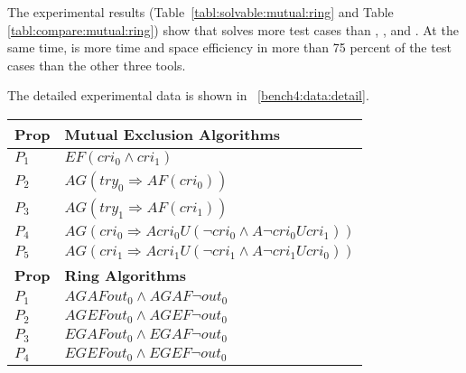
The experimental results (Table~\ref{tabl:solvable:mutual:ring} and Table \ref{tabl:compare:mutual:ring}) show that \sctl{} solves more test cases than \verds, \nusmv{}, and \nuxmv{}. At the same time, \sctl{} is more time and space efficiency in more than 75 percent of the test cases than the other three tools.  

The detailed experimental data is shown in ~\ref{bench4:data:detail}.

\begin{table}
	\begin{center}
		\begin{tabular}{| l | l |}
			\hline
			\textbf{Prop} & \textbf{Mutual Exclusion Algorithms}\\
			\hline
			{$P_1$} & $EF (cri_0 \wedge cri_1)$  \\
			\hline
			{$P_2$} &  $AG (try_0 \Rightarrow AF (cri_0))$\\
			\hline
			{$P_3$} &  $AG (try_1 \Rightarrow AF (cri_1))$\\
			
			\hline
			{$P_4$} &  $AG (cri_0 \Rightarrow A cri_0 U (\neg cri_0 \wedge A \neg cri_0 U cri_1))$  \\
			\hline
			{$P_5$} &  $AG (cri_1 \Rightarrow A cri_1 U (\neg cri_1 \wedge A \neg cri_1 U cri_0))$\\
			\hline
			\hline
			\textbf{Prop} & \textbf{Ring Algorithms}\\
			\hline
			{$P_1$} & $AGAF out_0 \wedge AGAF \neg out_0$ \\
			\hline
			{$P_2$} &  $AGEF out_0 \wedge AGEF \neg out_0$ \\
			\hline
			{$P_3$} &  $EGAF out_0 \wedge EGAF \neg out_0$\\
			
			\hline
			{$P_4$} &  $EGEF out_0 \wedge EGEF \neg out_0$ \\
			\hline
		\end{tabular}
	\end{center}
	\label{tabl:mutual:ring:properties}
\end{table}


